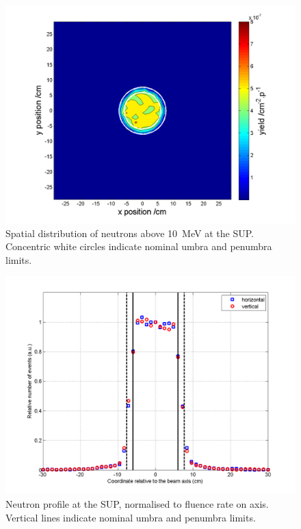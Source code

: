 \documentclass[11pt,a4paper]{IEEEtran}
\let\MYoriglatexcaption\caption
\renewcommand{\caption}[2][\relax]{\MYoriglatexcaption[#2]{#2}}
\begin{document}
\begin{figure}[t]
    \includegraphics[width=\columnwidth]{SUP10ColSpatialDistribution10MeVRADECS.png}
    \caption{
        Spatial distribution of neutrons above \SI{10}{\MeV} at the SUP.
        Concentric white circles indicate nominal umbra and penumbra limits.
    }
    \label{fig:SUPDensity}
\end{figure}

\begin{figure}[t]
    \includegraphics[width=\columnwidth]{SUP10beamproFoldingRADECS.png}
    \caption{
        Neutron profile at the SUP, normalised to fluence rate on axis.
        Vertical lines indicate nominal umbra and penumbra limits.
    }
    \label{fig:SUPProfile}
\end{figure}
\end{document}
